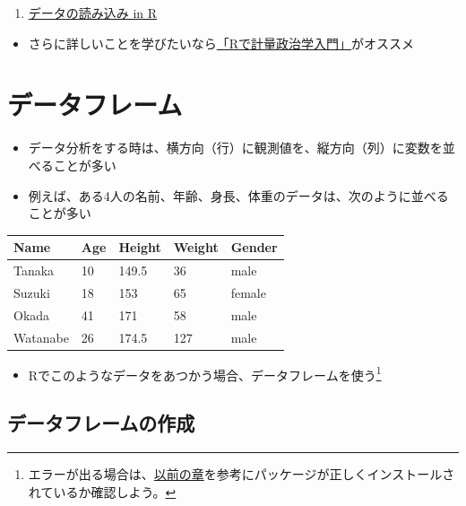 \documentclass[
]{book}
\providecommand{\tightlist}{%
  \setlength{\itemsep}{0pt}\setlength{\parskip}{0pt}}
\begin{document}
\begin{enumerate}
\def\labelenumi{\arabic{enumi}.}
\tightlist
\item
  \href{https://youtu.be/FugazO_rL7c}{データの読み込み in R}
\end{enumerate}

\begin{itemize}
\tightlist
\item
  さらに詳しいことを学びたいなら\href{https://shohei-doi.github.io/quant_polisci/index.html}{「Rで計量政治学入門」}がオススメ
\end{itemize}

\hypertarget{ux30c7ux30fcux30bfux30d5ux30ecux30fcux30e0}{%
\section{データフレーム}\label{ux30c7ux30fcux30bfux30d5ux30ecux30fcux30e0}}

\begin{itemize}
\tightlist
\item
  データ分析をする時は、横方向（行）に観測値を、縦方向（列）に変数を並べることが多い
\item
  例えば、ある4人の名前、年齢、身長、体重のデータは、次のように並べることが多い
\end{itemize}

\begin{longtable}[]{@{}lllll@{}}
\toprule\noalign{}
Name & Age & Height & Weight & Gender \\
\midrule\noalign{}
\endhead
\bottomrule\noalign{}
\endlastfoot
Tanaka & 10 & 149.5 & 36 & male \\
Suzuki & 18 & 153 & 65 & female \\
Okada & 41 & 171 & 58 & male \\
Watanabe & 26 & 174.5 & 127 & male \\
\end{longtable}

\begin{itemize}
\tightlist
\item
  Rでこのようなデータをあつかう場合、データフレームを使う\footnote{エラーが出る場合は、\protect\hyperlink{ux30d1ux30c3ux30b1ux30fcux30b8ux306eux30a4ux30f3ux30b9ux30c8ux30fcux30eb}{以前の章}を参考にパッケージが正しくインストールされているか確認しよう。}
\end{itemize}

\hypertarget{ux30c7ux30fcux30bfux30d5ux30ecux30fcux30e0ux306eux4f5cux6210}{%
\subsection{データフレームの作成}\label{ux30c7ux30fcux30bfux30d5ux30ecux30fcux30e0ux306eux4f5cux6210}}
\end{document}
